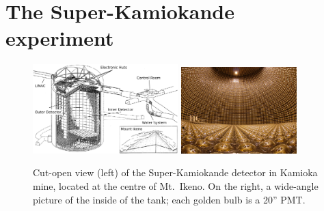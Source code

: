 \section{The Super-Kamiokande experiment}
\label{sec:sk}

\begin{figure}
	\centering
	\includegraphics[width=0.50\textwidth]{pics/superk-schematic-tags.png}
	\hfill
	\includegraphics[width=0.40\textwidth]{pics/superk-internal.jpeg}
	\caption[View of the Super-Kamiokande detector]%
	{Cut-open view (left) of the Super-Kamiokande detector in Kamioka mine, %
	located at the centre of Mt.\ Ikeno.
	On the right, a wide-angle picture of the inside of the tank; each golden bulb is a 20'' PMT.}
	\label{fig:sk_scheme}
\end{figure}

